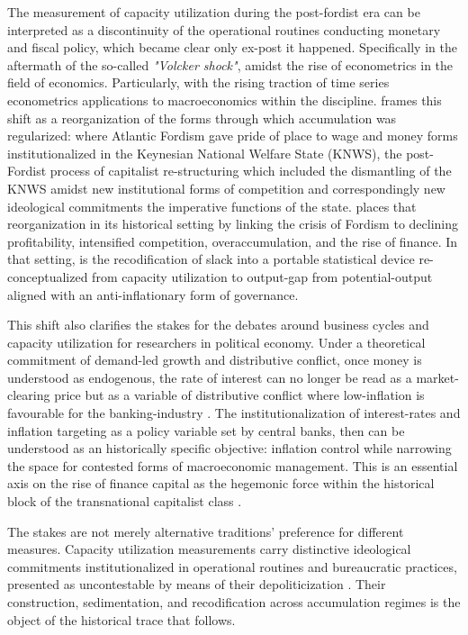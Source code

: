 \documentclass[11pt,a4paper]{article}
\begin{document}
The measurement of capacity utilization during the post-fordist era can be interpreted as a discontinuity of the operational routines conducting monetary and fiscal policy, which became clear only ex-post it happened. Specifically in the aftermath of the so-called \textit{"Volcker shock"}, amidst  the rise of econometrics in the field of economics. Particularly, with the rising traction of time series econometrics applications to macroeconomics  within the discipline. \citet{Jessop2002} frames this shift as a reorganization of the forms through which accumulation was regularized: where Atlantic Fordism gave pride of place to wage and money forms institutionalized in the Keynesian National Welfare State (KNWS), the  post-Fordist process of capitalist re-structuring which included the dismantling of the KNWS amidst new institutional forms of competition and correspondingly new ideological commitments the imperative functions of the state. \citet{Vidal2013} places that reorganization in its historical setting by linking the crisis of Fordism to declining profitability, intensified competition, overaccumulation, and the rise of finance. In that setting, is the recodification of slack into a portable statistical device re-conceptualized from capacity utilization to output-gap from  potential-output aligned with an anti-inflationary form of governance.

This shift also clarifies the stakes for the debates around business cycles and capacity utilization for researchers in political economy. Under a theoretical commitment of demand-led growth and distributive conflict, once money is understood as endogenous, the rate of interest can no longer be read as a market-clearing price but as a variable of distributive conflict where low-inflation is favourable for the banking-industry \citep{RochonSetterfield2008,LofaroMatamorosRochon2025}. The institutionalization of interest-rates and inflation targeting as a policy variable set by central banks, then can be understood as an historically specific objective: inflation control while narrowing the space for contested forms of macroeconomic management. This is an essential axis on the rise of finance capital as the hegemonic force within the historical block of the transnational capitalist class \citep{Robinson2000}. 

The stakes are not merely alternative traditions' preference for different
measures. Capacity utilization measurements carry distinctive ideological
commitments institutionalized in operational routines and bureaucratic
practices, presented as uncontestable by means of their depoliticization
\citep{Best2025}. Their construction, sedimentation, and recodification
across accumulation regimes is the object of the historical trace that
follows.
\end{document}
